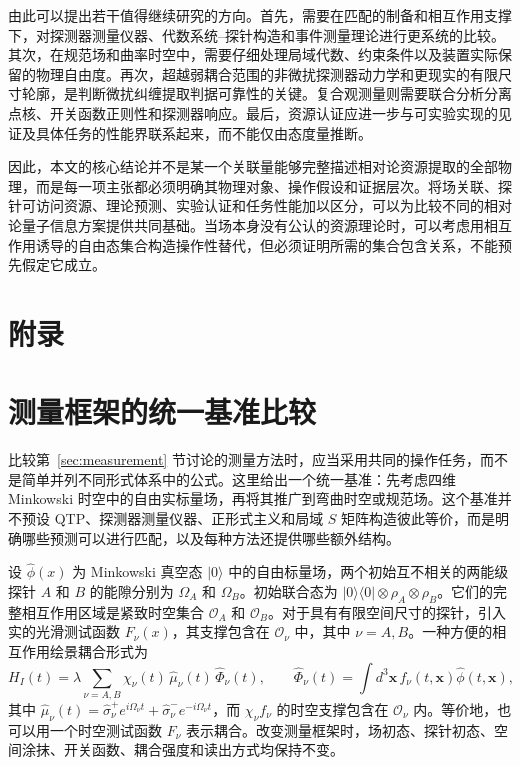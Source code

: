 \documentclass[UTF8,11pt,a4paper,fontset=none]{ctexart}
\begin{document}
由此可以提出若干值得继续研究的方向。首先，需要在匹配的制备和相互作用支撑下，对探测器测量仪器、代数系统--探针构造和事件测量理论进行更系统的比较。其次，在规范场和曲率时空中，需要仔细处理局域代数、约束条件以及装置实际保留的物理自由度。再次，超越弱耦合范围的非微扰探测器动力学和更现实的有限尺寸轮廓，是判断微扰纠缠提取判据可靠性的关键。复合观测量则需要联合分析分离点核、开关函数正则性和探测器响应。最后，资源认证应进一步与可实验实现的见证及具体任务的性能界联系起来，而不能仅由态度量推断。

因此，本文的核心结论并不是某一个关联量能够完整描述相对论资源提取的全部物理，而是每一项主张都必须明确其物理对象、操作假设和证据层次。将场关联、探针可访问资源、理论预测、实验认证和任务性能加以区分，可以为比较不同的相对论量子信息方案提供共同基础。当场本身没有公认的资源理论时，可以考虑用相互作用诱导的自由态集合构造操作性替代，但必须证明所需的集合包含关系，不能预先假定它成立。

\appendix
\section*{附录}
\makeatletter
{}
\makeatother
\renewcommand{\thefigure}{\thesection.\arabic{figure}}
\renewcommand{\thetable}{\thesection.\arabic{table}}
\renewcommand{\theHsection}{appendix.\Alph{section}}
\renewcommand{\theHequation}{appendix.\Alph{section}.\arabic{equation}}
\renewcommand{\theHfigure}{appendix.\Alph{section}.\arabic{figure}}
\renewcommand{\theHtable}{appendix.\Alph{section}.\arabic{table}}

\section{测量框架的统一基准比较}
\label{app:measurement-benchmark}



比较第~\ref{sec:measurement} 节讨论的测量方法时，应当采用共同的操作任务，而不是简单并列不同形式体系中的公式。这里给出一个统一基准：先考虑四维 Minkowski 时空中的自由实标量场，再将其推广到弯曲时空或规范场。这个基准并不预设 QTP、探测器测量仪器、正形式主义和局域 $S$ 矩阵构造彼此等价，而是明确哪些预测可以进行匹配，以及每种方法还提供哪些额外结构。

设 $\hat\phi(x)$ 为 Minkowski 真空态 $|0\rangle$ 中的自由标量场，两个初始互不相关的两能级探针 $A$ 和 $B$ 的能隙分别为 $\Omega_A$ 和 $\Omega_B$。初始联合态为 $|0\rangle\langle0|\otimes\rho_A\otimes\rho_B$。它们的完整相互作用区域是紧致时空集合 $\mathcal O_A$ 和 $\mathcal O_B$。对于具有有限空间尺寸的探针，引入实的光滑测试函数 $F_\nu(x)$，其支撑包含在 $\mathcal O_\nu$ 中，其中 $\nu=A,B$。一种方便的相互作用绘景耦合形式为
\begin{equation}
H_I(t)=\lambda\sum_{\nu=A,B}\chi_\nu(t)\,
\hat\mu_\nu(t)\,\hat\Phi_\nu(t),\qquad
\hat\Phi_\nu(t)=\int d^3\mathbf x\,f_\nu(t,\mathbf x)\hat\phi(t,\mathbf x),
\label{eq:benchmark-interaction}
\end{equation}
其中 $\hat\mu_\nu(t)=\hat\sigma_\nu^+e^{i\Omega_\nu t}
+\hat\sigma_\nu^-e^{-i\Omega_\nu t}$，而 $\chi_\nu f_\nu$ 的时空支撑包含在 $\mathcal O_\nu$ 内。等价地，也可以用一个时空测试函数 $F_\nu$ 表示耦合。改变测量框架时，场初态、探针初态、空间涂抹、开关函数、耦合强度和读出方式均保持不变。
\end{document}

